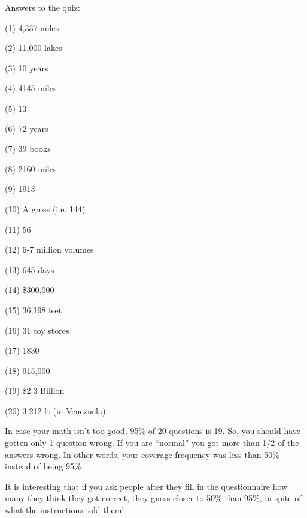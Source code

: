 \documentclass[12pt]{article}
\begin{document}
\newpage

 Answers to the quiz:

(1) 4,337 miles 

(2) 11,000 lakes

(3) 10 years 

(4) 4145 miles 

(5) 13 

(6) 72 years 

(7) 39 books

(8) 2160 miles 

(9) 1913 

(10) A gross (i.e. 144) 

(11) 56
  

(12) 6-7 million volumes 

(13) 645 days 

(14) \$300,000 

(15) 36,198 feet

(16) 31 toy stores 

(17) 1830 

(18) 915,000 

(19) \$2.3 Billion

(20) 3,212 ft (in Venezuela).

In case your math isn't too good, 95\% of 20 questions is 19.  So, you
should have gotten only 1 question wrong.  If you are ``normal'' you
got more than 1/2 of the answers wrong.  In other words, your coverage
frequency was less than 50\% instead of being 95\%.

It is interesting that if you ask people after they fill in the
questionnaire how many they think they got correct, they guess closer
to 50\% than 95\%, in spite of what the instructions told them!
\end{document}
